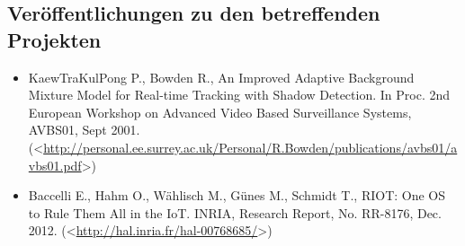 \documentclass[10pt,a4paper]{article}
\begin{document}
\subsection*{Veröffentlichungen zu den betreffenden Projekten} 
\begin{itemize}

\item KaewTraKulPong P., Bowden R., An Improved Adaptive Background Mixture Model for Real-time Tracking with Shadow Detection. In Proc. 2nd European Workshop on Advanced Video Based Surveillance Systems, AVBS01, Sept 2001. \newline (\textless\href{http://personal.ee.surrey.ac.uk/Personal/R.Bowden/publications/avbs01/avbs01.pdf}{http://personal.ee.surrey.ac.uk/Personal/R.Bowden/publications/avbs01/avbs01.pdf}\textgreater)

\item Baccelli E., Hahm O., Wählisch M., Günes M., Schmidt T., RIOT: One OS to Rule Them All in the IoT. INRIA, Research Report, No. RR-8176, Dec. 2012. \newline (\textless\href{http://hal.inria.fr/hal-00768685/}{http://hal.inria.fr/hal-00768685/}\textgreater)

\end{itemize}
\end{document}
